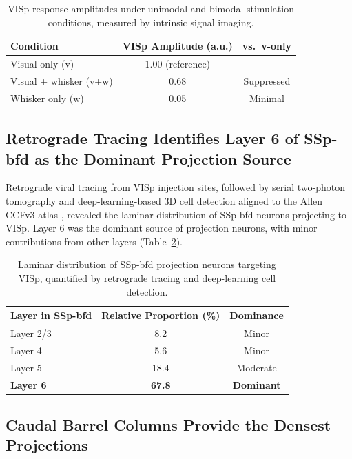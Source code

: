 \documentclass[11pt]{article}
\begin{document}
\begin{table}[H]
\centering
\caption{VISp response amplitudes under unimodal and bimodal stimulation conditions, measured by intrinsic signal imaging.}
\label{tab:isi_results}
\begin{tabular}{lcc}
\toprule
\textbf{Condition} & \textbf{VISp Amplitude (a.u.)} & \textbf{vs.\ v-only} \\
\midrule
Visual only (v) & 1.00 (reference) & --- \\
Visual + whisker (v+w) & 0.68 & Suppressed \\
Whisker only (w) & 0.05 & Minimal \\
\bottomrule
\end{tabular}
\end{table}

\subsection{Retrograde Tracing Identifies Layer 6 of SSp-bfd as the Dominant Projection Source}

Retrograde viral tracing from VISp injection sites, followed by serial two-photon tomography and deep-learning-based 3D cell detection aligned to the Allen CCFv3 atlas \citep{wang2020allen, tyson2022accurate}, revealed the laminar distribution of SSp-bfd neurons projecting to VISp. Layer 6 was the dominant source of projection neurons, with minor contributions from other layers (Table~\ref{tab:laminar_source}).

\begin{table}[H]
\centering
\caption{Laminar distribution of SSp-bfd projection neurons targeting VISp, quantified by retrograde tracing and deep-learning cell detection.}
\label{tab:laminar_source}
\begin{tabular}{lcc}
\toprule
\textbf{Layer in SSp-bfd} & \textbf{Relative Proportion (\%)} & \textbf{Dominance} \\
\midrule
Layer 2/3 & 8.2 & Minor \\
Layer 4 & 5.6 & Minor \\
Layer 5 & 18.4 & Moderate \\
\textbf{Layer 6} & \textbf{67.8} & \textbf{Dominant} \\
\bottomrule
\end{tabular}
\end{table}

\subsection{Caudal Barrel Columns Provide the Densest Projections}
\end{document}
